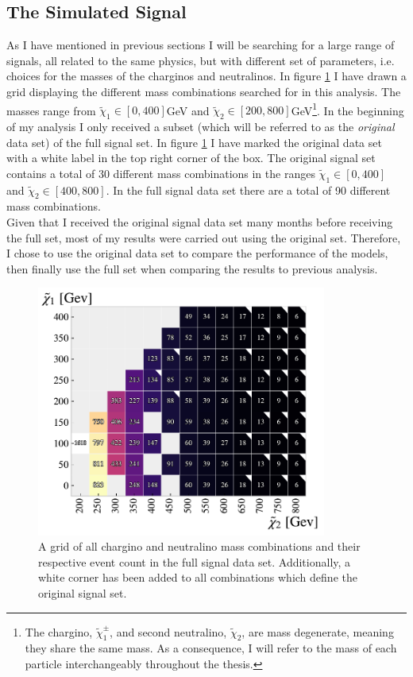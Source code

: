 \subsection{The Simulated Signal}\label{subsec:signal}
As I have mentioned in previous sections I will be searching for a large range of signals, all related to the same
physics, but with different set of parameters, i.e. choices for the masses of the charginos and neutralinos. In figure \ref{fig:nrSignal} I have drawn a 
grid displaying the different mass combinations searched for in this analysis. The masses range from ${\tilde{\chi}_1}\in[0,400]$GeV
and ${\tilde{\chi}_2}\in[200,800]$GeV\footnote{The chargino, $\tilde{\chi}^{\pm}_1$, and second neutralino, $\tilde{\chi}_2$, are mass degenerate, 
meaning they share the same mass. As a consequence, I will refer to the mass of each particle interchangeably throughout the thesis.}. In the beginning 
of my analysis I only received a subset (which will be referred to as the \emph{original} data set) of the full signal set. In figure \ref{fig:nrSignal} 
I have marked the original data set with a white label in the top right corner of the box. The original signal set contains a total of 30 different mass 
combinations in the ranges ${\tilde{\chi}_1}\in[0,400]$ and ${\tilde{\chi}_2}\in[400,800]$. In the full signal data set there are a total of 90 different 
mass combinations.
\\
Given that I received the original signal data set many months before receiving the full set, most of my results were carried out using the 
original set. Therefore, I chose to use the original data set to compare the performance of the models, then finally use the full set 
when comparing the results to previous analysis.
\begin{figure}
  \centering
  \includegraphics[width=0.85\textwidth]{Figures/MLResults/NN/SUSY/Grid/NrSignalEvents.pdf}
  \caption{A grid of all chargino and neutralino mass combinations and their respective event count in the full signal data set.
  Additionally, a white corner has been added to all combinations which define the original signal set.}
  \label{fig:nrSignal}
\end{figure}
